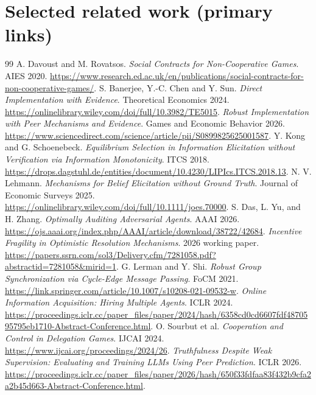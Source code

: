 \documentclass[10pt,a4paper]{article}
\begin{document}
\section*{Selected related work (primary links)}
\begin{thebibliography}{99}\setlength{\itemsep}{1pt}
 A. Davoust and M. Rovatsos. \emph{Social Contracts for Non-Cooperative Games}. AIES 2020. \url{https://www.research.ed.ac.uk/en/publications/social-contracts-for-non-cooperative-games/}.
 S. Banerjee, Y.-C. Chen and Y. Sun. \emph{Direct Implementation with Evidence}. Theoretical Economics 2024. \url{https://onlinelibrary.wiley.com/doi/full/10.3982/TE5015}.
 \emph{Robust Implementation with Peer Mechanisms and Evidence}. Games and Economic Behavior 2026. \url{https://www.sciencedirect.com/science/article/pii/S0899825625001587}.
 Y. Kong and G. Schoenebeck. \emph{Equilibrium Selection in Information Elicitation without Verification via Information Monotonicity}. ITCS 2018. \url{https://drops.dagstuhl.de/entities/document/10.4230/LIPIcs.ITCS.2018.13}.
 N. V. Lehmann. \emph{Mechanisms for Belief Elicitation without Ground Truth}. Journal of Economic Surveys 2025. \url{https://onlinelibrary.wiley.com/doi/full/10.1111/joes.70000}.
 S. Das, L. Yu, and H. Zhang. \emph{Optimally Auditing Adversarial Agents}. AAAI 2026. \url{https://ojs.aaai.org/index.php/AAAI/article/download/38722/42684}.
 \emph{Incentive Fragility in Optimistic Resolution Mechanisms}. 2026 working paper. \url{https://papers.ssrn.com/sol3/Delivery.cfm/7281058.pdf?abstractid=7281058\&mirid=1}.
 G. Lerman and Y. Shi. \emph{Robust Group Synchronization via Cycle-Edge Message Passing}. FoCM 2021. \url{https://link.springer.com/article/10.1007/s10208-021-09532-w}.
 \emph{Online Information Acquisition: Hiring Multiple Agents}. ICLR 2024. \url{https://proceedings.iclr.cc/paper_files/paper/2024/hash/6358cd0cd6607fdf4870595795eb1710-Abstract-Conference.html}.
 O. Sourbut et al. \emph{Cooperation and Control in Delegation Games}. IJCAI 2024. \url{https://www.ijcai.org/proceedings/2024/26}.
 \emph{Truthfulness Despite Weak Supervision: Evaluating and Training LLMs Using Peer Prediction}. ICLR 2026. \url{https://proceedings.iclr.cc/paper_files/paper/2026/hash/650f33fdfaa83f432b9cfa2a2b45d663-Abstract-Conference.html}.
\end{thebibliography}
\end{document}

